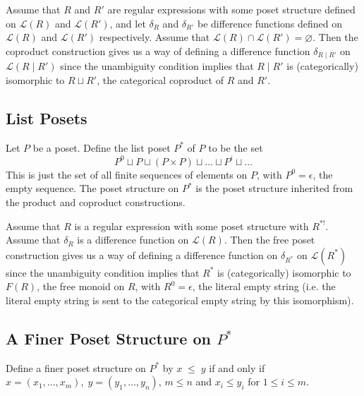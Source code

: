 \documentclass[acmsmall,review,anonymous]{acmart}\settopmatter{printfolios=true,printccs=false,printacmref=false}
\begin{document}
Assume that $R$ and $R'$ are regular expressions with some poset structure
defined on $\mathcal{L}(R)$ and $\mathcal{L}(R')$, and let $\delta_R$ and
$\delta_{R'}$ be difference functions defined on $\mathcal{L}(R)$ and
$\mathcal{L}(R')$ respectively. Assume that $\mathcal{L}(R) \cap
\mathcal{L}(R') = \varnothing$. Then the coproduct construction gives us a way
of defining a difference function $\delta_{R \; | \; R'}$ on $\mathcal{L}(R \;
| \; R')$ since the unambiguity condition implies that $R \; | \; R'$ is
(categorically) isomorphic to $R \sqcup R'$, the categorical coproduct of $R$
and $R'$.
\subsection{List Posets}
Let $P$ be a poset. Define the list poset $P^*$ of $P$ to be the set
$$P^0 \sqcup P \sqcup (P \times P) \sqcup \ldots \sqcup P^i \sqcup \ldots$$
This is just the set of all finite sequences of elements on $P$, with $P^0 =
\epsilon$, the empty sequence. The poset structure on $P^*$ is the poset
structure inherited from the product and coproduct constructions.

Assume that $R$ is a regular expression with some poset structure with $R^{*!}$.
Assume that $\delta_R$ is a difference function on $\mathcal{L}(R)$. Then
the free poset construction gives us a way of defining a difference function
on $\delta_{R^*}$ on $\mathcal{L}(R^*)$ since the unambiguity condition implies
that $R^*$ is (categorically) isomorphic to $F(R)$, the free monoid on $R$,
with $R^0 = \epsilon$, the literal empty string (i.e. the literal empty string
is sent to the categorical empty string by this isomorphism).

\subsection{A Finer Poset Structure on $P^*$}
Define a finer poset structure on $P^*$ by $x \; \leq \; y$
if and only if $x = (x_1, \ldots, x_m), \; y = (y_1, \ldots, y_n)$, $m \leq n$
and $x_i \leq y_i$ for $1 \leq i \leq m$.
\end{document}
